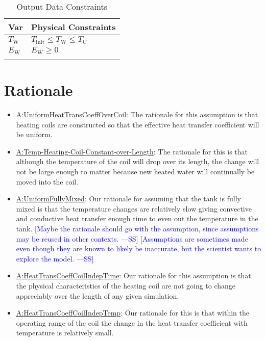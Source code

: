 \documentclass[12pt]{article}
\newcommand{\authornote}[3]{\textcolor{#1}{[#3 ---#2]}}
\newcommand{\authornote}[3]{}
\newcommand{\wss}[1]{\authornote{blue}{SS}{#1}}
\begin{document}
\begin{longtable}{l l}
\toprule
\textbf{Var} & \textbf{Physical Constraints}
\\
\midrule
\endhead
${T_{\text{W}}}$ & ${T_{\text{init}}}\leq{}{T_{\text{W}}}\leq{}{T_{\text{C}}}$
\\
${E_{\text{W}}}$ & ${E_{\text{W}}}\geq{}0$
\\
\bottomrule
\caption{Output Data Constraints}
\label{Table:OutDataConstraints}
\end{longtable}

\section{Rationale} \label{Sec:Rationale}

\begin{itemize}
\item \hyperref[assumpUnifHeatTransCoeffCoil]{A:UniformHeatTransCoeffOverCoil}:
The rationale for this assumption is that heating coils are constructed so that
the effective heat transfer coefficient will be uniform.
\item \hyperref[assumpTHCCoL]{A:Temp-Heating-Coil-Constant-over-Length}: The
rationale for this is that although the temperature of the coil will drop over
its length, the change will not be large enough to matter because new heated
water will continually be moved into the coil.
\item \hyperref[assumpFullyMixed]{A:UniformFullyMixed}: Our rationale for assuming
that the tank is fully mixed is that the temperature changes are relatively slow
giving convective and conductive heat transfer enough time to even out the
temperature in the tank.  \wss{Maybe the rationale should go with the
assumption, since assumptions may be reused in other contexts.}
\wss{Assumptions are sometimes made even though they are known to likely be
inaccurate, but the scientist wants to explore the model.}
\item \hyperref[assumpHeatTransCoilIndepTime]{A:HeatTransCoeffCoilIndepTime}:
Our rationale for this assumption is that the physical characteristics of the
heating coil are not going to change appreciably over the length of any given
simulation.
\item \hyperref[assumpHeatTransCoilIndepTemp]{A:HeatTransCoeffCoilIndepTemp}:
Our rationale for this is that within the operating range of the coil the change
in the heat transfer coefficient with temperature is relatively small.
\end{itemize}
        
\end{document}
